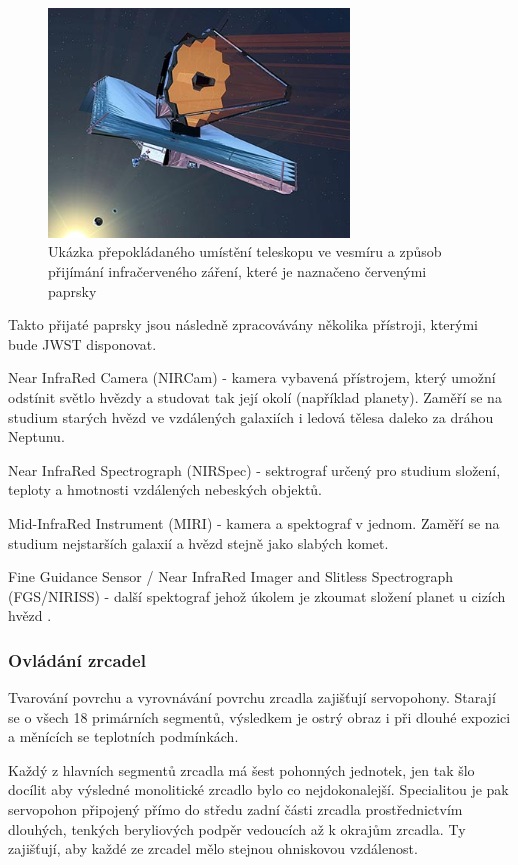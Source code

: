 \documentclass[a4paper,11pt]{article}
\begin{document}
\begin{figure}[h]
\begin{center}
\includegraphics[width=8cm]{webbPaprsky.eps}
\caption{Ukázka přepokládaného umístění teleskopu ve vesmíru a způsob přijímání infračerveného záření, které je naznačeno červenými paprsky}
\label{paprskyWebb}
\end{center}
\end{figure}

Takto přijaté paprsky jsou následně zpracovávány několika přístroji, kterými bude JWST disponovat.

Near InfraRed Camera (NIRCam) - kamera vybavená přístrojem, který umožní odstínit světlo hvězdy a studovat tak její okolí (například planety). Zaměří se na studium starých hvězd ve vzdálených galaxiích i ledová tělesa daleko za dráhou Neptunu.

Near InfraRed Spectrograph (NIRSpec) - sektrograf určený pro studium složení, teploty a hmotnosti vzdálených nebeských objektů.

Mid-InfraRed Instrument (MIRI) - kamera a spektograf v jednom. Zaměří se na studium nejstarších galaxií a hvězd stejně jako slabých komet.

Fine Guidance Sensor / Near InfraRed Imager and Slitless Spectrograph (FGS/NIRISS) - další spektograf jehož úkolem je zkoumat složení planet u cizích hvězd \cite{abcko}.

\subsubsection{Ovládání zrcadel}
Tvarování povrchu a vyrovnávání povrchu zrcadla zajišťují servopohony. Starají se o všech 18 primárních segmentů,  výsledkem je ostrý obraz i při dlouhé expozici a měnících se teplotních podmínkách.


Každý z hlavních segmentů zrcadla má šest pohonných jednotek, jen tak šlo docílit aby výsledné monolitické zrcadlo bylo co nejdokonalejší. Specialitou je pak servopohon připojený přímo do středu zadní části zrcadla prostřednictvím dlouhých, tenkých beryliových podpěr vedoucích až k okrajům zrcadla. Ty zajišťují, aby každé ze zrcadel mělo stejnou ohniskovou vzdálenost.
\end{document}
